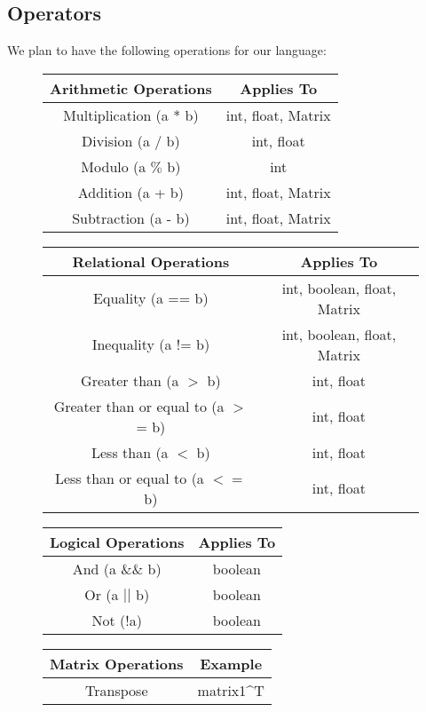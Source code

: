 \documentclass[12pt]{article}
\begin{document}
\subsection{Operators}
We plan to have the following operations for our language:
\begin{figure}[h]
\centering
\begin{tabular}{|c|c|}
\hline
Arithmetic Operations & Applies To \\ \hline
Multiplication (a * b)        & int, float, Matrix  \\ \hline
Division (a / b)              & int, float   \\ \hline
Modulo (a $\%$ b)                & int  \\ \hline
Addition (a + b)             & int, float, Matrix   \\ \hline
Subtraction (a - b)     & int, float, Matrix  \\ \hline
\end{tabular}
\medbreak
\begin{tabular}{|c|c|}
\hline
Relational Operations    & Applies To             \\ \hline
Equality (a == b)               & int, boolean, float, Matrix             \\ \hline
Inequality (a != b)               &  int, boolean, float, Matrix               \\ \hline
Greater than  (a $>$ b)           & int, float    \\ \hline
Greater than or equal to (a $>$= b) & int, float \\ \hline
Less than (a $<$ b)               & int, float       \\ \hline
Less than or equal to (a $<=$ b)    & int, float    \\ \hline
\end{tabular}
\medbreak
\begin{tabular}{|c|c|}
\hline
Logical Operations & Applies To  \\ \hline
And (a \&\& b)              & boolean \\ \hline
Or (a $||$ b)                & boolean   \\ \hline
Not (!a)               & boolean       \\ \hline
\end{tabular}
\medbreak
\begin{tabular}{|c|c|}
\hline
Matrix Operations & Example                    \\ \hline
Transpose         & matrix1\textasciicircum{}T \\ \hline
\end{tabular}
\end{figure}
\end{document}
